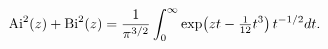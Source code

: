 \[{\mathop{\mathrm{Ai}\/}\nolimits^{2}}\!\left(z\right)+{\mathop{\mathrm{Bi}\/}%
\nolimits^{2}}\!\left(z\right)=\frac{1}{\pi^{3/2}}\int_{0}^{\infty}\mathop{%
\exp\/}\nolimits\!\left(zt-\tfrac{1}{12}t^{3}\right)t^{-1/2}dt.\]